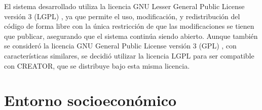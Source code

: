 El sistema desarrollado utiliza la licencia GNU Lesser General Public License
versión 3 (LGPL) \parencite{lgpl}, ya que permite el uso, modificación, y
redistribución del código de forma libre con la única restricción de que las
modificaciones se tienen que publicar, asegurando que el sistema continúa siendo
abierto. Aunque también se consideró la licencia GNU General Public License
versión 3 (GPL) \parencite{gpl}, con características similares, se decidió
utilizar la licencia LGPL para ser compatible con CREATOR, que se distribuye
bajo esta misma licencia.

\section{Entorno socioeconómico}\label{sec:environment}
